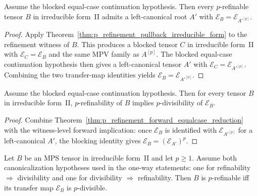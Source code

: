 \begin{theorem}
    \label{thm:p_refinement_forward_equalcase_reduction}
    \leanok
    Assume the blocked equal-case continuation hypothesis. Then every
    $p$-refinable tensor $B$ in irreducible form~II admits a left-canonical root
    $A'$ with $\mathcal E_B = \mathcal E_{A'^{[p]}}$.
\end{theorem}

\begin{proof}\leanok
    Apply Theorem~\ref{thm:p_refinement_pullback_irreducible_form} to the
    refinement witness of $B$. This produces a blocked tensor $C$ in
    irreducible form~II with $\mathcal E_C = \mathcal E_B$ and the same MPV
    family as $A^{[p]}$. The blocked equal-case continuation hypothesis then
    gives a left-canonical tensor $A'$ with
    $\mathcal E_C = \mathcal E_{A'^{[p]}}$. Combining the two transfer-map
    identities yields $\mathcal E_B = \mathcal E_{A'^{[p]}}$.
\end{proof}

\begin{theorem}
    \label{thm:thm_4_1_p_refinement_forward_blocked_equalcase}
    \leanok
    Assume the blocked equal-case continuation hypothesis. Then for every tensor
    $B$ in irreducible form~II, $p$-refinability of $B$ implies
    $p$-divisibility of $\mathcal E_B$.
\end{theorem}

\begin{proof}\leanok
    Combine Theorem~\ref{thm:p_refinement_forward_equalcase_reduction} with the
    witness-level forward implication: once $\mathcal E_B$ is identified with
    $\mathcal E_{A'^{[p]}}$ for a left-canonical $A'$, the blocking identity
    gives $\mathcal E_B = (\mathcal E_{A'})^p$.
\end{proof}

\begin{theorem}%
    \label{thm:thm_4_1_p_refinement}
    \leanok
    Let $B$ be an MPS tensor in irreducible form~II and let $p \ge 1$.
    Assume both canonicalization hypotheses used in the one-way statements:
    one for refinability $\Rightarrow$ divisibility and one for divisibility
    $\Rightarrow$ refinability. Then $B$ is $p$-refinable iff its transfer
    map $\mathcal{E}_B$ is $p$-divisible.
\end{theorem}

